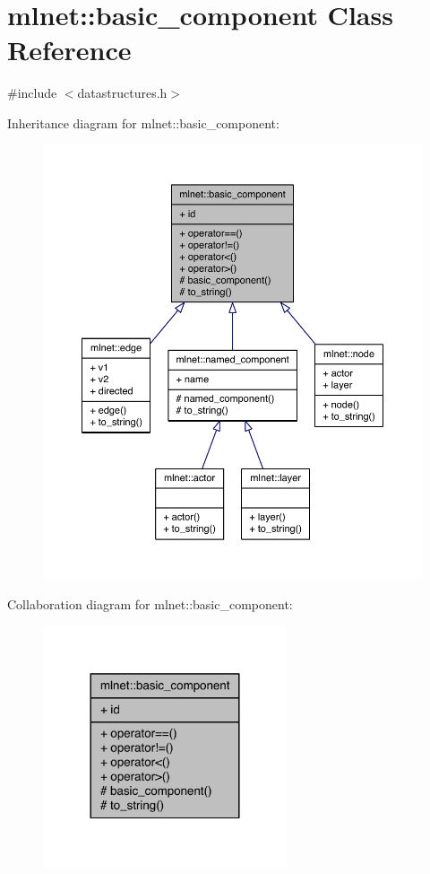 \hypertarget{classmlnet_1_1basic__component}{\section{mlnet\+:\+:basic\+\_\+component Class Reference}
\label{classmlnet_1_1basic__component}
}


{\ttfamily \#include $<$datastructures.\+h$>$}



Inheritance diagram for mlnet\+:\+:basic\+\_\+component\+:\nopagebreak
\begin{figure}[H]
\begin{center}
\leavevmode
\includegraphics[width=350pt]{classmlnet_1_1basic__component__inherit__graph}
\end{center}
\end{figure}


Collaboration diagram for mlnet\+:\+:basic\+\_\+component\+:\nopagebreak
\begin{figure}[H]
\begin{center}
\leavevmode
\includegraphics[width=204pt]{classmlnet_1_1basic__component__coll__graph}
\end{center}
\end{figure}
